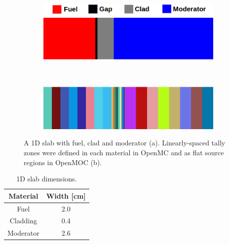 \begin{figure}[h!]
\begin{subfigure}{\textwidth}
  \centering
  \includegraphics[width=\linewidth]{figures/biases/slab/slab-simple-labels}
  \caption{}
\end{subfigure} \\
\begin{subfigure}{\textwidth}
  \centering
  \includegraphics[width=\linewidth]{figures/biases/slab/slab-8x}
  \caption{}
\end{subfigure}
\caption[1D slab materials and geometry]{A 1D slab with fuel, clad and moderator (a). Linearly-spaced tally zones were defined in each material in OpenMC and as flat source regions in OpenMOC (b).}
\label{fig:chap4-slab}
\end{figure}

\begin{table}[h!]
  \centering
  \caption{1D slab dimensions.}
  \label{table:chap2-slab-widths} 
  \vspace{14pt}
  \begin{tabular}{c c}
  \toprule
  \multicolumn{1}{c}{\bf Material} &
  \multicolumn{1}{c}{\bf Width [cm]} \\
  \midrule
  Fuel & 2.0 \\
  Cladding & 0.4 \\
  Moderator & 2.6 \\
  \bottomrule
\end{tabular}
\end{table}

